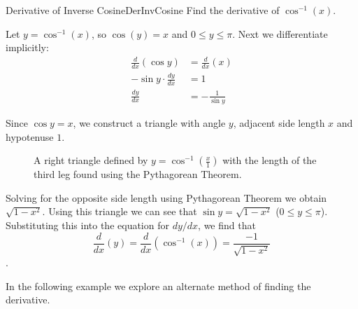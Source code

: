 \begin{example}{Derivative of Inverse Cosine}{DerInvCosine}
Find the derivative of $\cos^{-1}(x)$.
\end{example}
\begin{solution}
Let $y=\cos^{-1}(x)$, so $\cos(y)=x$ and $0\leq y\leq \pi$. Next we differentiate implicitly:
\begin{align*}
\frac{d}{dx}\left(\cos y\right)&=\frac{d}{dx}\left(x\right)	\\
-\sin y\cdot\frac{dy}{dx}&=1	\\
\frac{dy}{dx}&=-\frac{1}{\sin y}
\end{align*}

 Since $\cos y=x$, we construct a triangle with angle $y$, adjacent side length $x$ and hypotenuse $1$. 
 
 \begin{figure}
 \centering
 
 \caption{\label{fig:inverse3}A right triangle defined by $y=\cos ^{-1}(\frac{x}{1})$ with the length of the third leg found using the Pythagorean Theorem.}
 \end{figure}
 
 
 Solving for the opposite side length using Pythagorean Theorem we obtain $\sqrt{1-x^2}$. Using this triangle we can see that $\sin y=\sqrt{1-x^2}$ ($0\leq y\leq \pi$). Substituting this into the equation for $dy/dx$, we find that
\[\frac{d}{dx}\left(y\right)=\frac{d}{dx}\left(\cos^{-1}(x)\right)=\frac{-1}{\sqrt{1-x^2}}\].
\end{solution}

In the following example we explore an alternate method of finding the derivative.

